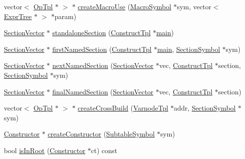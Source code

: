 \begin{DoxyCompactItemize}
\item 
vector$<$ \mbox{\hyperlink{class_op_tpl}{Op\+Tpl}} $\ast$ $>$ $\ast$ \mbox{\hyperlink{class_sleigh_compile_a9576fc0c7e5e7ed41b3adf76a31edd72}{create\+Macro\+Use}} (\mbox{\hyperlink{class_macro_symbol}{Macro\+Symbol}} $\ast$sym, vector$<$ \mbox{\hyperlink{class_expr_tree}{Expr\+Tree}} $\ast$ $>$ $\ast$param)
\item 
\mbox{\hyperlink{class_section_vector}{Section\+Vector}} $\ast$ \mbox{\hyperlink{class_sleigh_compile_a3f62e53fa5c0f511490d4e01653de8eb}{standalone\+Section}} (\mbox{\hyperlink{class_construct_tpl}{Construct\+Tpl}} $\ast$\mbox{\hyperlink{slgh__compile_8cc_a3c04138a5bfe5d72780bb7e82a18e627}{main}})
\item 
\mbox{\hyperlink{class_section_vector}{Section\+Vector}} $\ast$ \mbox{\hyperlink{class_sleigh_compile_a5b1db8a0c6f01322e117577d323c75cd}{first\+Named\+Section}} (\mbox{\hyperlink{class_construct_tpl}{Construct\+Tpl}} $\ast$\mbox{\hyperlink{slgh__compile_8cc_a3c04138a5bfe5d72780bb7e82a18e627}{main}}, \mbox{\hyperlink{class_section_symbol}{Section\+Symbol}} $\ast$sym)
\item 
\mbox{\hyperlink{class_section_vector}{Section\+Vector}} $\ast$ \mbox{\hyperlink{class_sleigh_compile_aa13d1d257844710ebb377e734e1ca6e6}{next\+Named\+Section}} (\mbox{\hyperlink{class_section_vector}{Section\+Vector}} $\ast$vec, \mbox{\hyperlink{class_construct_tpl}{Construct\+Tpl}} $\ast$section, \mbox{\hyperlink{class_section_symbol}{Section\+Symbol}} $\ast$sym)
\item 
\mbox{\hyperlink{class_section_vector}{Section\+Vector}} $\ast$ \mbox{\hyperlink{class_sleigh_compile_a95a09437387d25e9c256633a487bd6cd}{final\+Named\+Section}} (\mbox{\hyperlink{class_section_vector}{Section\+Vector}} $\ast$vec, \mbox{\hyperlink{class_construct_tpl}{Construct\+Tpl}} $\ast$section)
\item 
vector$<$ \mbox{\hyperlink{class_op_tpl}{Op\+Tpl}} $\ast$ $>$ $\ast$ \mbox{\hyperlink{class_sleigh_compile_ac6de6c64a443c17ee0c0b33d0dbf4458}{create\+Cross\+Build}} (\mbox{\hyperlink{class_varnode_tpl}{Varnode\+Tpl}} $\ast$addr, \mbox{\hyperlink{class_section_symbol}{Section\+Symbol}} $\ast$sym)
\item 
\mbox{\hyperlink{class_constructor}{Constructor}} $\ast$ \mbox{\hyperlink{class_sleigh_compile_ac31ebb2619890f9c574cd2c18d198995}{create\+Constructor}} (\mbox{\hyperlink{class_subtable_symbol}{Subtable\+Symbol}} $\ast$sym)
\item 
bool \mbox{\hyperlink{class_sleigh_compile_a2171aa9db2aaed657dd587ca5a098747}{is\+In\+Root}} (\mbox{\hyperlink{class_constructor}{Constructor}} $\ast$ct) const

\end{DoxyCompactItemize}
